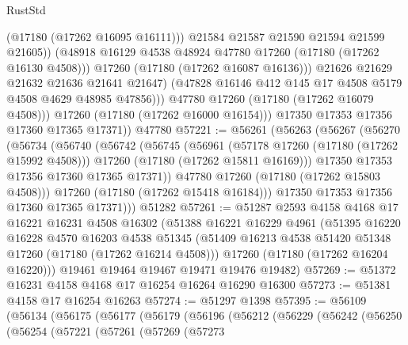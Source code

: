\begin{lexlean}{RustStd}
\begin{coremodule}
{\begin{coremodule}
{{{{{{{{{{{{{{{{{{{{{{{{{{{{{{{{{{{{{{{{{{{{{{{{{{{{{{{                          (@17180 (@17262 @16095 @16111)))
                        @21584
                        @21587
                        @21590
                        @21594
                        @21599
                        @21605))
                    (@48918 @16129 @4538 @48924 @47780 @17260 (@17180 (@17262 @16130 @4508)))
                    @17260
                    (@17180 (@17262 @16087 @16136)))
                  @21626
                  @21629
                  @21632
                  @21636
                  @21641
                  @21647)
                (@47828 @16146 @412 @145 @17 @4508 @5179 @4508 @4629 @48985 @47856)))
            @47780
            @17260
            (@17180 (@17262 @16079 @4508)))
          @17260
          (@17180 (@17262 @16000 @16154)))
        @17350
        @17353
        @17356
        @17360
        @17365
        @17371))
    @47780
@57221 := @56261
    (@56263
      (@56267
        (@56270
          (@56734
            (@56740
              (@56742
                (@56745
                  (@56961
                    (@57178 @17260 (@17180 (@17262 @15992 @4508)))
                    @17260
                    (@17180 (@17262 @15811 @16169)))
                  @17350
                  @17353
                  @17356
                  @17360
                  @17365
                  @17371))
              @47780
              @17260
              (@17180 (@17262 @15803 @4508)))
            @17260
            (@17180 (@17262 @15418 @16184)))
          @17350
          @17353
          @17356
          @17360
          @17365
          @17371)))
    @51282
@57261 := @51287
    @2593
    @4158
    @4168
    @17
    @16221
    @16231
    @4508
    @16302
    (@51388
      @16221
      @16229
      @4961
      (@51395
        @16220
        @16228
        @4570
        @16203
        @4538
        @51345
        (@51409 @16213 @4538 @51420 @51348 @17260 (@17180 (@17262 @16214 @4508)))
        @17260
        (@17180 (@17262 @16204 @16220)))
      @19461
      @19464
      @19467
      @19471
      @19476
      @19482)
@57269 := @51372 @16231 @4158 @4168 @17 @16254 @16264 @16290 @16300
@57273 := @51381 @4158 @17 @16254 @16263
@57274 := @51297 @1398
@57395 := @56109
    (@56134
      (@56175
        (@56177
          (@56179
            (@56196
              (@56212
                (@56229
                  (@56242
                    (@56250
                      (@56254
                        (@57221
                          (@57261
                            (@57269
                              (@57273
}}}}}}}}}}}}}}}}}}}}}}}}}}}}}}}}}}}}}}}}}}}}}}}}}}}}}}}
\end{coremodule}}
\end{coremodule}
\end{lexlean}
